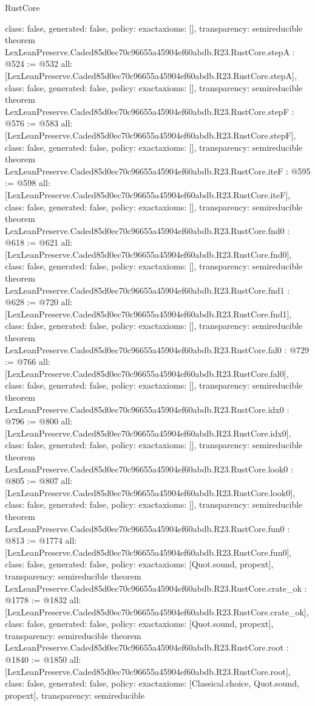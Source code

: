 \begin{lexlean}{RustCore}
\begin{coremodule}
{  class: false,
  generated: false,
  policy: exact{axioms: []},
  transparency: semireducible
}
theorem LexLeanPreserve.Caded85d0ec70c96655a45904ef60abdb.R23.RustCore.stepA : @524 := @532 {
  all: [LexLeanPreserve.Caded85d0ec70c96655a45904ef60abdb.R23.RustCore.stepA],
  class: false,
  generated: false,
  policy: exact{axioms: []},
  transparency: semireducible
}
theorem LexLeanPreserve.Caded85d0ec70c96655a45904ef60abdb.R23.RustCore.stepF : @576 := @583 {
  all: [LexLeanPreserve.Caded85d0ec70c96655a45904ef60abdb.R23.RustCore.stepF],
  class: false,
  generated: false,
  policy: exact{axioms: []},
  transparency: semireducible
}
theorem LexLeanPreserve.Caded85d0ec70c96655a45904ef60abdb.R23.RustCore.iteF : @595 := @598 {
  all: [LexLeanPreserve.Caded85d0ec70c96655a45904ef60abdb.R23.RustCore.iteF],
  class: false,
  generated: false,
  policy: exact{axioms: []},
  transparency: semireducible
}
theorem LexLeanPreserve.Caded85d0ec70c96655a45904ef60abdb.R23.RustCore.fnd0 : @618 := @621 {
  all: [LexLeanPreserve.Caded85d0ec70c96655a45904ef60abdb.R23.RustCore.fnd0],
  class: false,
  generated: false,
  policy: exact{axioms: []},
  transparency: semireducible
}
theorem LexLeanPreserve.Caded85d0ec70c96655a45904ef60abdb.R23.RustCore.fnd1 : @628 := @720 {
  all: [LexLeanPreserve.Caded85d0ec70c96655a45904ef60abdb.R23.RustCore.fnd1],
  class: false,
  generated: false,
  policy: exact{axioms: []},
  transparency: semireducible
}
theorem LexLeanPreserve.Caded85d0ec70c96655a45904ef60abdb.R23.RustCore.fal0 : @729 := @766 {
  all: [LexLeanPreserve.Caded85d0ec70c96655a45904ef60abdb.R23.RustCore.fal0],
  class: false,
  generated: false,
  policy: exact{axioms: []},
  transparency: semireducible
}
theorem LexLeanPreserve.Caded85d0ec70c96655a45904ef60abdb.R23.RustCore.idx0 : @796 := @800 {
  all: [LexLeanPreserve.Caded85d0ec70c96655a45904ef60abdb.R23.RustCore.idx0],
  class: false,
  generated: false,
  policy: exact{axioms: []},
  transparency: semireducible
}
theorem LexLeanPreserve.Caded85d0ec70c96655a45904ef60abdb.R23.RustCore.look0 : @805 := @807 {
  all: [LexLeanPreserve.Caded85d0ec70c96655a45904ef60abdb.R23.RustCore.look0],
  class: false,
  generated: false,
  policy: exact{axioms: []},
  transparency: semireducible
}
theorem LexLeanPreserve.Caded85d0ec70c96655a45904ef60abdb.R23.RustCore.fun0 : @813 := @1774 {
  all: [LexLeanPreserve.Caded85d0ec70c96655a45904ef60abdb.R23.RustCore.fun0],
  class: false,
  generated: false,
  policy: exact{axioms: [Quot.sound, propext]},
  transparency: semireducible
}
theorem LexLeanPreserve.Caded85d0ec70c96655a45904ef60abdb.R23.RustCore.crate_ok : @1778 := @1832 {
  all: [LexLeanPreserve.Caded85d0ec70c96655a45904ef60abdb.R23.RustCore.crate_ok],
  class: false,
  generated: false,
  policy: exact{axioms: [Quot.sound, propext]},
  transparency: semireducible
}
theorem LexLeanPreserve.Caded85d0ec70c96655a45904ef60abdb.R23.RustCore.root : @1840 := @1850 {
  all: [LexLeanPreserve.Caded85d0ec70c96655a45904ef60abdb.R23.RustCore.root],
  class: false,
  generated: false,
  policy: exact{axioms: [Classical.choice, Quot.sound, propext]},
  transparency: semireducible
}


\end{coremodule}
\end{lexlean}
